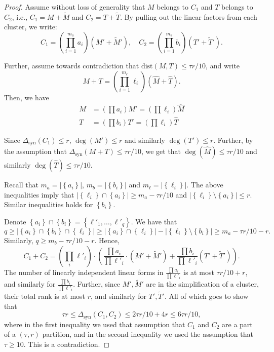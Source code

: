 \documentclass[12pt]{article}
\renewcommand{\set}[1]{\left\{ #1 \right\}}
\newcommand{\ranksyn}{\Delta_{\text{syn}}}
\newcommand{\dist}{\text{dist}}
\begin{document}
	
	\begin{proof}
		Assume without loss of generality that $M$ belongs to $C_1$ and $T$ belongs to $C_2$, i.e., $C_1 = M + \tilde{M}$ and $C_2 = T + \tilde{T}$.
		By pulling out the linear factors from each cluster, we write:
		\[
		C_1 = \left( \prod_{i=1}^{m_a} a_i \right) (M' + \tilde{M}'), \quad C_2 = \left( \prod_{i=1}^{m_b} b_i\right)  (T' + \tilde{T}').
		\]
		
		Further, assume towards contradiction that $\dist(M, T) \le \tau r / 10$, and write
		\[
		M + T = \left( \prod_{i=1}^{m_\ell} \ell_i\right) (\widehat{M} + \widehat{T}).
		\]
		Then, we have
		\begin{align*}
			M &= \left( \prod a_i \right) M' = \left(\prod \ell_i \right) \widehat{M}\\
			T &= \left( \prod b_i \right) T' = \left(\prod \ell_i \right) \widehat{T}
		\end{align*}
		
		Since $\ranksyn(C_1) \le r$, $\deg(M') \le r$ and similarly $\deg(T') \le r$. Further, by the assumption that $\ranksyn(M+T) \le \tau r / 10$, we get that $\deg(\widehat{M}) \le \tau r / 10$ and similarly $\deg(\widehat{T}) \le \tau r / 10$.
		
		Recall that $m_a = |\set{a_i}|$, $m_b = |\set{b_i}|$ and $m_\ell = |\set{\ell_i}|$. The above inequalities imply that
		$|\set{\ell_i} \cap \set{a_i}| \ge m_a- \tau r / 10$ and $|\set{\ell_i} \setminus \set{a_i}| \le r$. Similar inequalities holds for $\set{b_i}$.
		

		Denote $\set{a_i} \cap \set{b_i} = \set{\ell'_1, \ldots, \ell'_q}$. We have that
		\[
		q \ge |\set{a_i} \cap \set{b_i} \cap \set{\ell_i}| \ge |\set{a_i} \cap \set{\ell_i}| - |\set{\ell_i} \setminus \set{b_i}| \ge m_a - \tau r / 10 - r.
		\]
		Similarly, $q \ge m_b - \tau r / 10 - r$.
		Hence,
		\[
		C_1 + C_2 = \left( \prod_i \ell'_i \right) \cdot \left( \frac{\prod a_i}{\prod \ell'_i} \cdot \left(M' + \tilde{M}' \right) +
		\frac{\prod b_i}{\prod \ell'_i} \left(T' + \tilde{T}' \right)
		\right).
		\]
		The number of linearly independent linear forms in $ \frac{\prod a_i}{\prod \ell'_i}$ is at most $\tau r / 10 + r$, and similarly for $\frac{\prod b_i}{\prod \ell'_i}$.
		Further, since $M', \tilde{M}'$ are in the simplification of a cluster, their total rank is at most $r$, and similarly for $T', \tilde{T}'$. All of which goes to show that
		\[
		\tau r\leq \ranksyn(C_1, C_2) \le 2 \tau r / 10 + 4 r \leq 6 \tau r / 10,
		\]
		where in the first inequality we used that assumption that $C_1$ and $C_2$ are a part of a $(\tau, r)$ partition, and in the second inequality we used the assumption that $\tau\geq 10$. This is a contradiction.
	\end{proof}
	
\end{document}
